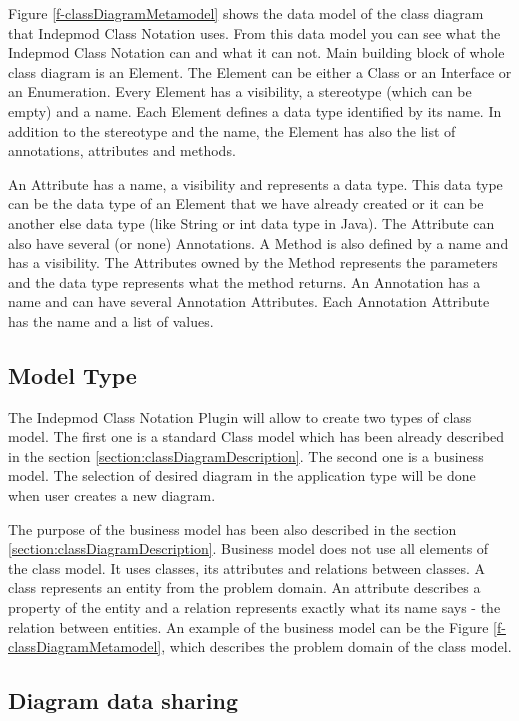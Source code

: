 Figure \ref{f-classDiagramMetamodel} shows the data model of the class diagram that Indepmod Class Notation uses. From this data model you can see what the Indepmod Class Notation can and what it can not. Main building block of whole class diagram is an Element. The Element can be either a Class or an Interface or an Enumeration. Every Element has a visibility, a stereotype (which can be empty) and a name. Each Element defines a data type identified by its name. In addition to the stereotype and the name, the Element has also the list of annotations, attributes and methods.

An Attribute has a name, a visibility and represents a data type. This data type can be the data type of an Element that we have already created or it can be another else data type (like String or int data type in Java). The Attribute can also have several (or none) Annotations. A Method is also defined by a name and has a visibility. The Attributes owned by the Method represents the parameters and the data type represents what the method returns. An Annotation has a name and can have several Annotation Attributes. Each Annotation Attribute has the name and a list of values.

\subsection{Model Type}

The Indepmod Class Notation Plugin will allow to create two types of class model. The first one is a standard Class model which has been already described in the section \ref{section:classDiagramDescription}. The second one is a business model. The selection of desired diagram in the application type will be done when user creates a new diagram. 

The purpose of the business model has been also described in the section \ref{section:classDiagramDescription}. Business model does not use all elements of the class model. It uses classes, its attributes and relations between classes. A class represents an entity from the problem domain. An attribute describes a property of the entity and a relation represents exactly what its name says - the relation between entities. An example of the business model can be the Figure \ref{f-classDiagramMetamodel}, which describes the problem domain of the class model.

\subsection{Diagram data sharing}

